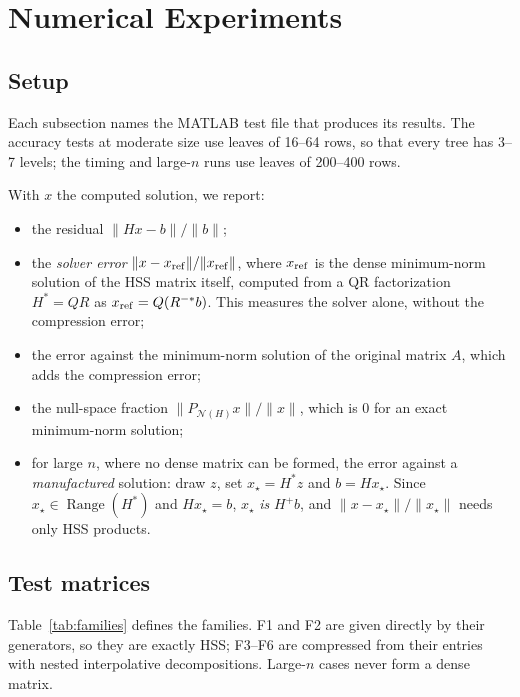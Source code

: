 \section{Numerical Experiments}\label{sec:numerics}

\subsection{Setup}\label{subsec:protocol}
Each subsection names the MATLAB test file that produces its results. The accuracy tests at moderate size
use leaves of 16--64 rows, so that every tree has 3--7 levels; the timing and large-$n$ runs use leaves of
200--400 rows. \PlatformSentence

With $x$ the computed solution, we report:
\begin{itemize}[leftmargin=1.5em,itemsep=1pt]
\item the residual $\|Hx-b\|/\|b\|$;
\item the \emph{solver error} $\|x-x_{\rm ref}\|/\|x_{\rm ref}\|$, where $x_{\rm ref}$ is the dense minimum-norm
solution of the HSS matrix itself, computed from a QR factorization $H^*=QR$ as $x_{\rm ref}=Q(R^{-*}b)$. This
measures the solver alone, without the compression error;
\item the error against the minimum-norm solution of the original matrix $A$, which adds the compression
error;
\item the null-space fraction $\|P_{\mathcal N(H)}x\|/\|x\|$, which is $0$ for an exact minimum-norm solution;
\item for large $n$, where no dense matrix can be formed, the error against a \emph{manufactured}
solution: draw $z$, set $x_\star=H^*z$ and $b=Hx_\star$. Since $x_\star\in\operatorname{Range}(H^*)$ and
$Hx_\star=b$, $x_\star$ \emph{is} $H^+b$, and $\|x-x_\star\|/\|x_\star\|$ needs only HSS products.
\end{itemize}

\subsection{Test matrices}\label{subsec:testmatrices}
Table~\ref{tab:families} defines the families. F1 and F2 are given directly by their generators, so they
are exactly HSS; F3--F6 are compressed from their entries with nested interpolative decompositions.
Large-$n$ cases never form a dense matrix.

